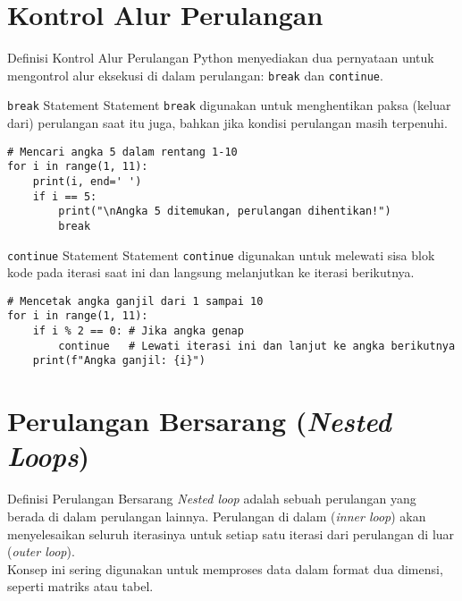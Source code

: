 \documentclass[aspectratio=169, table]{beamer}
\begin{document}
\section{Kontrol Alur Perulangan}
\begin{frame}[fragile]{Definisi Kontrol Alur Perulangan}
Python menyediakan dua pernyataan untuk mengontrol alur eksekusi di dalam perulangan: \texttt{break} dan \texttt{continue}.
\end{frame}

\begin{frame}[fragile]{\texttt{break} Statement}
Statement \texttt{break} digunakan untuk menghentikan paksa (keluar dari) perulangan saat itu juga, bahkan jika kondisi perulangan masih terpenuhi.

\begin{lstlisting}[style=PythonStyle, caption={Kode Python: break_keyword.py}]
# Mencari angka 5 dalam rentang 1-10
for i in range(1, 11):
    print(i, end=' ')
    if i == 5:
        print("\nAngka 5 ditemukan, perulangan dihentikan!")
        break 
\end{lstlisting}
\end{frame}

\begin{frame}[fragile]{\texttt{continue} Statement}
Statement \texttt{continue} digunakan untuk melewati sisa blok kode pada iterasi saat ini dan langsung melanjutkan ke iterasi berikutnya.

\begin{lstlisting}[style=PythonStyle, caption={Kode Python: continue_keyword.py}]
# Mencetak angka ganjil dari 1 sampai 10
for i in range(1, 11):
    if i % 2 == 0: # Jika angka genap
        continue   # Lewati iterasi ini dan lanjut ke angka berikutnya
    print(f"Angka ganjil: {i}")
\end{lstlisting}
\end{frame}

\section{Perulangan Bersarang (\textit{Nested Loops})}
\begin{frame}{Definisi Perulangan Bersarang}
\textit{Nested loop} adalah sebuah perulangan yang berada di dalam perulangan lainnya. Perulangan di dalam (\textit{inner loop}) akan menyelesaikan seluruh iterasinya untuk setiap satu iterasi dari perulangan di luar (\textit{outer loop}).
\\
Konsep ini sering digunakan untuk memproses data dalam format dua dimensi, seperti matriks atau tabel.
\end{frame}
\end{document}
